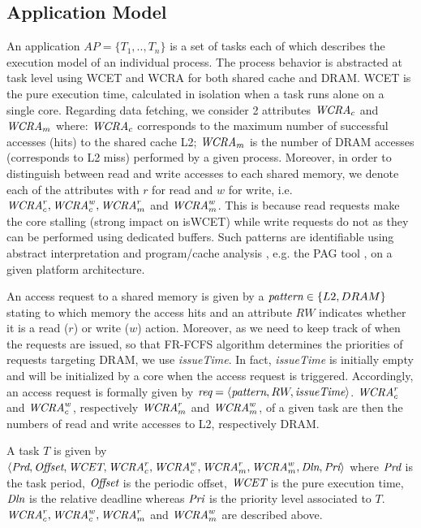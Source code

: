 \subsection{Application Model}
An application $AP=\{T_1,..,T_n\}$ is a set of tasks each of which describes the execution model of an individual process. The process behavior is abstracted at task level using WCET and WCRA for both shared cache and DRAM. WCET is the pure execution time, calculated in isolation when a task runs alone on a single core. Regarding data fetching, we consider 2 attributes $\emph{WCRA}_c$ and $\emph{WCRA}_m$ where: $\emph{WCRA}_c$ corresponds to the maximum number of successful accesses (hits) to the shared cache L2; $\emph{WCRA}_m$ is the number of DRAM accesses (corresponds to L2 miss) performed by a given process. Moreover, in order to distinguish between read and write accesses to each shared memory, we denote each of the attributes with $r$ for read and $w$ for write, i.e. $\emph{WCRA}_c^r, \emph{WCRA}_c^w, \emph{WCRA}_m^r$ and $\emph{WCRA}_m^w$. This is because read requests make the core stalling (strong impact on isWCET) while write requests do not as they can be performed using dedicated buffers. Such patterns are identifiable using abstract interpretation \cite{Wang2010} and program/cache analysis \cite{Ferdinand1999}, e.g. the PAG tool \cite{PAG}, on a given platform architecture. %

An access request to a shared memory is given by a $\emph{pattern}\in \{L2, DRAM\}$ stating to which memory the access hits and an attribute $RW$ indicates whether it is a read ($r$) or write ($w$) action. Moreover, as we need to keep track of when the requests are issued, so that FR-FCFS algorithm determines the priorities of requests targeting DRAM, we use \emph{issueTime}. 
In fact, \emph{issueTime} is initially empty and will be initialized by a core when the access request is triggered. Accordingly, an access request is formally given by $\emph{req}=\langle \emph{pattern}, RW, \emph{issueTime}\rangle$. 
$\emph{WCRA}_c^r$ and $\emph{WCRA}_c^w$, respectively $\emph{WCRA}_m^r$ and $\emph{WCRA}_m^w$, of a given task are then the numbers of read and write accesses to L2, respectively DRAM.

\begin{definition} A task $T$ is given by $\small{\langle \emph{Prd}, \emph{Offset}, \emph{WCET}, \CR, \CW, \MR,\MW, \emph{Dln}, \emph{Pri}\rangle}$ where $\emph{Prd}$ is the task period, $\emph{Offset}$ is the periodic offset, $\emph{WCET}$ is the pure execution time, $\emph{Dln}$ is the relative deadline whereas $\emph{Pri}$ is the priority level associated to $T$.
$\emph{WCRA}_c^r, \emph{WCRA}_c^w, \emph{WCRA}_m^r$ and $\emph{WCRA}_m^w$ are described above.
\end{definition}


